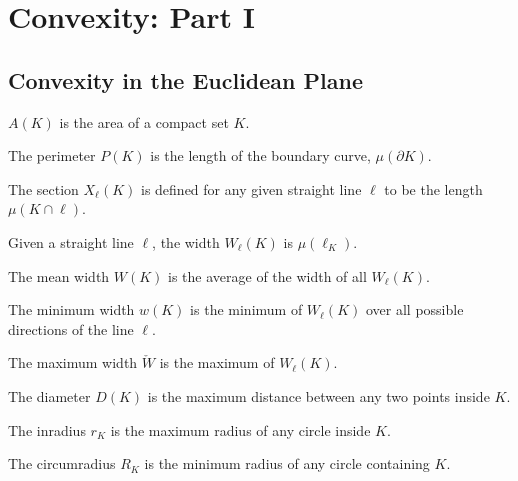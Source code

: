 \documentclass[crop=false,class=article,oneside]{standalone}
\begin{document}
    \ifx\ifworkmasterswork\undefined
        \section*{Convexity: Part I}
        \setcounter{section}{1}
    \fi
    \subsection{Convexity in the Euclidean Plane}
        \begin{definition}
        $A(K)$ is the area of a compact set $K$.
        \end{definition}
        \begin{definition}
        The perimeter $P(K)$ is the length of the boundary curve, $\mu(\partial K)$.
        \end{definition}
        \begin{definition}
        The section $X_{\ell}(K)$ is defined for any given straight line $\ell$ to be the length $\mu(K\cap \ell)$.
        \end{definition}
        \begin{definition}
        Given a straight line $\ell$, the width $W_{\ell}(K)$ is $\mu(\ell_{K})$.
        \end{definition}
        \begin{definition}
        The mean width $W(K)$ is the average of the width of all $W_{\ell}(K)$.
        \end{definition}
        \begin{definition}
        The minimum width $w(K)$ is the minimum of $W_{\ell}(K)$ over all possible directions of the line $\ell$.
        \end{definition}
        \begin{definition}
        The maximum width $\check{W}$ is the maximum of $W_{\ell}(K)$.
        \end{definition}
        \begin{definition}
        The diameter $D(K)$ is the maximum distance between any two points inside $K$.
        \end{definition}
        \begin{definition}
        The inradius $r_K$ is the maximum radius of any circle inside $K$.
        \end{definition}
        \begin{definition}
        The circumradius $R_K$ is the minimum radius of any circle containing $K$.
        \end{definition}
\end{document}
